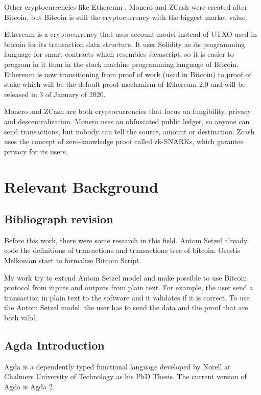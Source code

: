 \documentclass[12pt]{article}
\begin{document}
Other cryptocurrencies like Ethereum \cite{wood2014ethereum}, Monero \cite{noether2015ring} and
ZCash \cite{hopwood2016zcash} were created after Bitcoin,
but Bitcoin is still the cryptocurrency with the biggest market value.

Ethereum is a cryptocurrency that uses account model instead of UTXO used in bitcoin for its
transaction data structure.
It uses Solidity as its programming language for smart contracts which resembles Javascript,
so it is easier to program in it than in the stack machine programming language of Bitcoin.
Ethereum is now transitioning from proof of work (used in Bitcoin) to proof of stake
which will be the default proof mechanism of Ethereum 2.0 and will be released in
3 of January of 2020.

Monero and ZCash are both cryptocurrencies that focus on fungibility, privacy and descentralization.
Monero uses an obfuscated public ledger, so anyone can send transactions,
but nobody can tell the source, amount or destination.
Zcash uses the concept of zero-knowledge proof called zk-SNARKs, which garantee privacy for its users.

\section{Relevant Background}

\subsection{Bibliograph revision}

Before this work, there were some research in this field.
Antom Setzel \cite{setzer2018modelling} already code the definitions of transactions and
transactions tree of bitcoin.
Orestis Melkonian start to formalize Bitcoin Script.

My work try to extend Antom Setzel model and make possible to use Bitcoin protocol
from inputs and outputs from plain text.
For example, the user send a transaction in plain text to the software and it validates if it is correct.
To use the Antom Setzel model, the user has to send the data and the proof that are both valid.

\subsection{Agda Introduction}
Agda is a dependently typed functional language developed by Norell at Chalmers University of Technology
as his PhD Thesis.
The current version of Agda is Agda 2.
\end{document}
